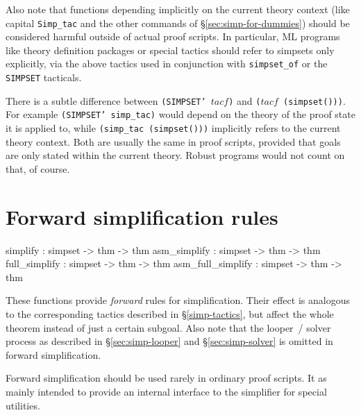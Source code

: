 \medskip

Also note that functions depending implicitly on the current theory
context (like capital \texttt{Simp_tac} and the other commands of
\S\ref{sec:simp-for-dummies}) should be considered harmful outside of
actual proof scripts.  In particular, ML programs like theory
definition packages or special tactics should refer to simpsets only
explicitly, via the above tactics used in conjunction with
\texttt{simpset_of} or the \texttt{SIMPSET} tacticals.

\begin{warn}
  There is a subtle difference between \texttt{(SIMPSET'~$tacf$)} and
  \texttt{($tacf$~(simpset()))}.  For example \texttt{(SIMPSET'
    simp_tac)} would depend on the theory of the proof state it is
  applied to, while \texttt{(simp_tac (simpset()))} implicitly refers
  to the current theory context.  Both are usually the same in proof
  scripts, provided that goals are only stated within the current
  theory.  Robust programs would not count on that, of course.
\end{warn}


\section{Forward simplification rules}
\begin{ttbox}
simplify          : simpset -> thm -> thm
asm_simplify      : simpset -> thm -> thm
full_simplify     : simpset -> thm -> thm
asm_full_simplify : simpset -> thm -> thm
\end{ttbox}

These functions provide \emph{forward} rules for simplification.
Their effect is analogous to the corresponding tactics described in
\S\ref{simp-tactics}, but affect the whole theorem instead of just a
certain subgoal.  Also note that the looper~/ solver process as
described in \S\ref{sec:simp-looper} and \S\ref{sec:simp-solver} is
omitted in forward simplification.

\begin{warn}
  Forward simplification should be used rarely in ordinary proof
  scripts.  It as mainly intended to provide an internal interface to
  the simplifier for special utilities.
\end{warn}



